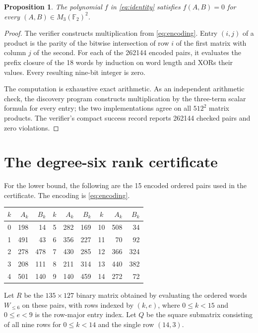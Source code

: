 \documentclass[11pt]{amsart}
\newtheorem{proposition}[theorem]{Proposition}
\theoremstyle{definition}
\newcommand{\F}{\mathbb F}
\newcommand{\Mat}{M_3(\F_2)}
\begin{document}
\begin{proposition}\label{prop:upper}
The polynomial \(f\) in \eqref{eq:identity} satisfies
\(f(A,B)=0\) for every \((A,B)\in\Mat^2\).
\end{proposition}

\begin{proof}
The verifier constructs multiplication from \eqref{eq:encoding}.  Entry
\((i,j)\) of a product is the parity of the bitwise intersection of row \(i\)
of the first matrix with column \(j\) of the second.  For each of the 262144
encoded pairs, it evaluates the prefix closure of the 18 words by induction on
word length and XORs their values.  Every resulting nine-bit integer is zero.

The computation is exhaustive exact arithmetic.  As an independent arithmetic
check, the discovery program constructs multiplication by the three-term scalar
formula for every entry; the two implementations agree on all \(512^2\) matrix
products.  The verifier's compact success record reports 262144 checked pairs
and zero violations.
\end{proof}

\section{The degree-six rank certificate}

For the lower bound, the following are the 15 encoded ordered pairs used in the
certificate.  The encoding is \eqref{eq:encoding}.

\begin{center}
\begin{tabular}{c@{\qquad}rr@{\qquad}c@{\qquad}rr@{\qquad}c@{\qquad}rr}
\toprule
\(k\)&\(A_k\)&\(B_k\)&\(k\)&\(A_k\)&\(B_k\)&\(k\)&\(A_k\)&\(B_k\)\\
\midrule
0&198&14&5&282&169&10&508&34\\
1&491&43&6&356&227&11&70&92\\
2&278&478&7&430&285&12&366&324\\
3&208&111&8&211&314&13&440&382\\
4&501&140&9&140&459&14&272&72\\
\bottomrule
\end{tabular}
\end{center}

Let \(R\) be the \(135\times127\) binary matrix obtained by evaluating the
ordered words \(W_{\le6}\) on these pairs, with rows indexed by \((k,e)\),
where \(0\le k<15\) and \(0\le e<9\) is the row-major entry index.  Let \(Q\)
be the square submatrix consisting of all nine rows for \(0\le k<14\) and the
single row \((14,3)\).
\end{document}
